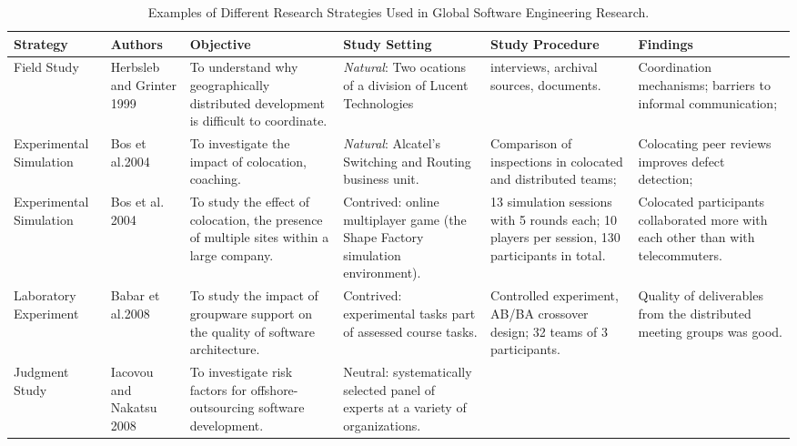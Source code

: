 \documentclass[runningheads]{llncs}
\begin{document}
\begin{table}
\caption{Examples of Different Research Strategies Used in Global Software Engineering Research.}\label{tab1}
\begin{tabularx}{1\textwidth} { 
   >{\raggedright\arraybackslash}X 
   >{\raggedright\arraybackslash}X 
   >{\raggedright\arraybackslash}X 
   >{\raggedright\arraybackslash}X
   >{\raggedright\arraybackslash}X
   >{\raggedright\arraybackslash}X }
\hline
Strategy & Authors &  Objective &  Study Setting &  Study Procedure & Findings
\\
\hline
Field Study &  
Herbsleb and Grinter 1999 \cite{ref_proc1} & 
To understand why geographically distributed development is difficult to coordinate. & 
\emph{Natural}: Two ocations of a division of Lucent Technologies &
18 interviews, archival sources, documents.&
Coordination mechanisms; barriers to informal communication; 
\\
\hline
Experimental Simulation & 

Bos et al.2004 \cite{ref_proc3} &

To investigate the impact of colocation, coaching. & 

\emph{Natural}: Alcatel’s Switching and Routing business unit.  & 
Comparison of inspections in colocated and distributed teams;&
Colocating peer reviews improves defect detection; 
\\
\hline
Experimental Simulation &
Bos et al. 2004 \cite{ref_proc2} &

To study the effect of
colocation, the
presence of multiple
sites within a large
company. &

Contrived: online
multiplayer game (the
Shape Factory
simulation
environment).& 

13 simulation sessions
with 5 rounds each;
10 players per session,
130 participants in total. &

Colocated participants
collaborated more with each
other than with
telecommuters. 
\\
\hline
Laboratory Experiment & 
Babar et al.2008 ~\cite{ref_article10} &
To study the impact of groupware support on the quality of software architecture. &
Contrived: experimental tasks part of assessed course tasks. &
Controlled experiment, AB/BA crossover design; 32 teams of 3 participants. & 
Quality of deliverables from the distributed meeting groups was good.
\\
\hline
Judgment Study &
Iacovou and Nakatsu 2008 \cite{ref_book1} &
To investigate risk factors for offshore-outsourcing software development. &
Neutral: systematically selected panel of experts at a variety of organizations. &


\end{tabularx}
\end{table}
\end{document}
